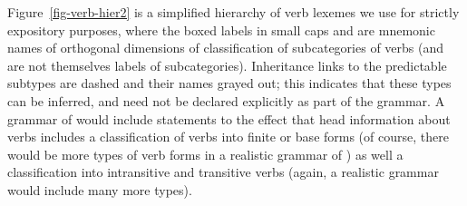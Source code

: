 \documentclass[output=paper
	        ,collection
	        ,collectionchapter
 	        ,biblatex
                ,babelshorthands
                ,newtxmath
                ,draftmode
                ,colorlinks, citecolor=brown
]{langscibook}
\begin{document}
Figure~\ref{fig-verb-hier2} is a simplified  hierarchy of verb lexemes we use for strictly expository purposes, where the boxed labels in small caps  and  are mnemonic names of orthogonal dimensions of classification  of subcategories of verbs (and are not themselves labels of subcategories). Inheritance links to the predictable subtypes are dashed and their names grayed out; this indicates that these types can be inferred, and need not be declared explicitly as part of the grammar. A grammar of  would include statements to the effect that head information about verbs includes a classification of verbs into finite or base forms (of course, there would be more types of verb forms in a realistic grammar of ) as well a classification into intransitive and transitive verbs (again, a realistic grammar would include many more types).
\end{document}
